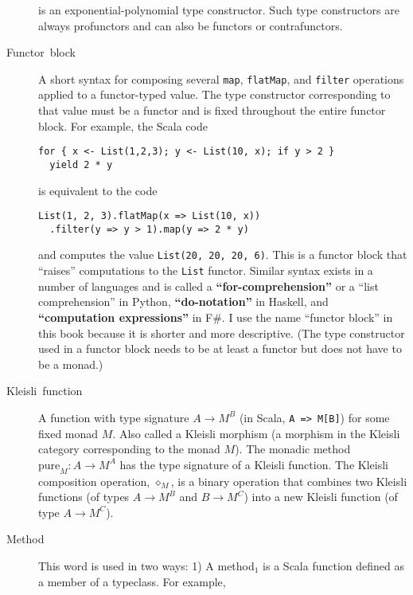 \begin{description}
is an exponential-polynomial type constructor. Such type constructors
are always profunctors and can also be functors or contrafunctors.
\item [{\index{functor block}Functor~block}] A short syntax for composing
several \lstinline!map!, \lstinline!flatMap!, and \lstinline!filter!
operations applied to a functor-typed value. The type constructor
corresponding to that value must be a functor and is fixed throughout
the entire functor block. For example, the Scala code
\begin{lstlisting}
for { x <- List(1,2,3); y <- List(10, x); if y > 2 }
  yield 2 * y
\end{lstlisting}
is equivalent to the code
\begin{lstlisting}
List(1, 2, 3).flatMap(x => List(10, x))
  .filter(y => y > 1).map(y => 2 * y)
\end{lstlisting}
and computes the value \lstinline!List(20, 20, 20, 6)!. This is a
functor block that \textsf{``}raises\textsf{''} computations to the \lstinline!List!
functor. Similar syntax exists in a number of languages and is called
a \textbf{\textsf{``}for-comprehension\textsf{''}}
or a \textsf{``}list comprehension\textsf{''} in Python, \textbf{\textsf{``}do-notation\textsf{''}}
in Haskell, and \textbf{\textsf{``}computation expressions\textsf{''}}
in F\#. I use the name \textsf{``}functor block\textsf{''} in this book because it
is shorter and more descriptive. (The type constructor used in a functor
block needs to be at least a functor but does not have to be a monad.)
\item [{Kleisli~function}]  A function with
type signature $A\rightarrow M^{B}$ (in Scala, \lstinline!A => M[B]!)
for some fixed monad $M$. Also called a Kleisli morphism
(a morphism in the Kleisli category corresponding to the monad $M$).
The monadic method $\text{pure}_{M}:A\rightarrow M^{A}$ has the type
signature of a Kleisli function. The Kleisli composition operation,
$\diamond_{M}$, is a binary operation that combines two Kleisli functions
(of types $A\rightarrow M^{B}$ and $B\rightarrow M^{C}$) into a
new Kleisli function (of type $A\rightarrow M^{C}$).
\item [{\index{method}Method}] This word is used in two ways: 1) A method$_{1}$
is a Scala function defined as a member of a typeclass. For example,

\end{description}
